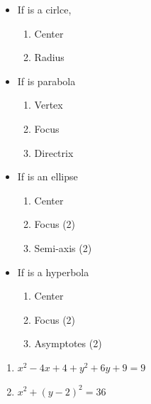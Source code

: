 \documentclass[a4paper]{tufte-handout} %
\begin{document}
\begin{minipage}[c]{0.45\textwidth}
\begin{itemize}
    \item If is a cirlce,
        \begin{enumerate}
            \item Center
            \item Radius
        \end{enumerate}
    \item If is parabola
        \begin{enumerate}
            \item Vertex
            \item Focus
            \item Directrix
        \end{enumerate}
\end{itemize}
\end{minipage}
\begin{minipage}[c]{0.45\textwidth}
\begin{itemize}
    \item If is an ellipse
        \begin{enumerate}
            \item Center 
            \item Focus (2)
            \item Semi-axis (2)
        \end{enumerate}
    \item If is a hyperbola
        \begin{enumerate}
            \item Center
            \item Focus (2)
            \item Asymptotes (2)
        \end{enumerate}
\end{itemize}


\end{minipage}



\begin{enumerate}
    \item $x^2 -4x +4 + y^2 + 6y +9 = 9$
    \item $x^2 + (y-2)^2 = 36$
\end{enumerate}
\end{document}
